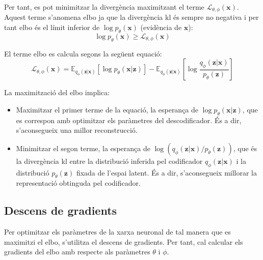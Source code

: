 \documentclass[CAT,BIB]{TFUOC}%
\begin{document}
        Per tant, es pot minimitzar la divergència maximitzant el terme $\mathcal{L}_{\theta,\phi}(\mathbf{x})$.
        Aquest terme s'anomena \gls{elbo}
        ja que la divergència \gls{kl} és sempre no negativa i
        per tant \gls{elbo} és el límit inferior de $\log p_\theta(\mathbf{x})$
        (evidència de $\mathbf{x}$):
        \begin{equation}
            \label{eq:lim_inf}
            \log p_\theta(\mathbf{x}) \ge
            \mathcal{L}_{\theta,\phi}(\mathbf{x})
        \end{equation}

        El terme \gls{elbo} es calcula segons la següent equació:
        \begin{equation}
        \label{eq:elbo}
            \mathcal{L}_{\theta,\phi}(\mathbf{x}) =
            \mathbb{E}_{q_\phi(\mathbf{z|x})}
                [ \log p_\theta(\mathbf{x|z}) ] -
            \mathbb{E}_{q_\phi(\mathbf{z|x})} \left[
                \log \frac {q_\phi(\mathbf{z|x})}
                           {p_\theta(\mathbf{z})}
            \right]
        \end{equation}

        La maximització del \gls{elbo} implica:
        \begin{itemize}
            \item Maximitzar el primer terme de la equació,
            la esperança de $\log p_\theta(\mathbf{x|z})$,
            que es correspon amb optimitzar els paràmetres del descodificador.
            És a dir, s'aconsegueix una millor reconstrucció.

            \item Minimitzar el segon terme,
            la esperança de $\log ( q_\phi(\mathbf{z|x}) / p_\theta(\mathbf{z}) )$,
            que és la divergència \gls{kl} entre
            la distribució inferida pel codificador $q_\phi(\mathbf{z|x})$
            i la distribució $p_\theta(\mathbf{z})$ fixada de l'espai latent.
            És a dir, s'aconsegueix millorar la representació obtinguda pel codificador.
        \end{itemize}

    \subsection{Descens de gradients}
    \label{s:vae_gradients}

        Per optimitzar els paràmetres de la xarxa neuronal
        de tal manera que es maximitzi el \gls{elbo},
        s'utilitza el descens de gradients.
        Per tant, cal calcular els gradients del \gls{elbo}
        amb respecte als paràmetres $\theta$ i $\phi$.
\end{document}
